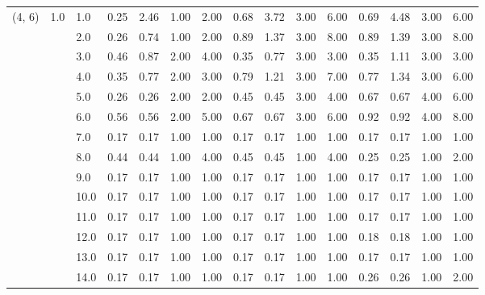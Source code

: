 \begin{tabular}{lllrrrrrrrrrrrr}
(4, 6) & 1.0 & 1.0  &       0.25 &      2.46 & 1.00 &   2.00 &       0.68 &      3.72 &  3.00 &   6.00 &       0.69 &      4.48 &  3.00 &   6.00 \\
       &     & 2.0  &       0.26 &      0.74 & 1.00 &   2.00 &       0.89 &      1.37 &  3.00 &   8.00 &       0.89 &      1.39 &  3.00 &   8.00 \\
       &     & 3.0  &       0.46 &      0.87 & 2.00 &   4.00 &       0.35 &      0.77 &  3.00 &   3.00 &       0.35 &      1.11 &  3.00 &   3.00 \\
       &     & 4.0  &       0.35 &      0.77 & 2.00 &   3.00 &       0.79 &      1.21 &  3.00 &   7.00 &       0.77 &      1.34 &  3.00 &   6.00 \\
       &     & 5.0  &       0.26 &      0.26 & 2.00 &   2.00 &       0.45 &      0.45 &  3.00 &   4.00 &       0.67 &      0.67 &  4.00 &   6.00 \\
       &     & 6.0  &       0.56 &      0.56 & 2.00 &   5.00 &       0.67 &      0.67 &  3.00 &   6.00 &       0.92 &      0.92 &  4.00 &   8.00 \\
       &     & 7.0  &       0.17 &      0.17 & 1.00 &   1.00 &       0.17 &      0.17 &  1.00 &   1.00 &       0.17 &      0.17 &  1.00 &   1.00 \\
       &     & 8.0  &       0.44 &      0.44 & 1.00 &   4.00 &       0.45 &      0.45 &  1.00 &   4.00 &       0.25 &      0.25 &  1.00 &   2.00 \\
       &     & 9.0  &       0.17 &      0.17 & 1.00 &   1.00 &       0.17 &      0.17 &  1.00 &   1.00 &       0.17 &      0.17 &  1.00 &   1.00 \\
       &     & 10.0 &       0.17 &      0.17 & 1.00 &   1.00 &       0.17 &      0.17 &  1.00 &   1.00 &       0.17 &      0.17 &  1.00 &   1.00 \\
       &     & 11.0 &       0.17 &      0.17 & 1.00 &   1.00 &       0.17 &      0.17 &  1.00 &   1.00 &       0.17 &      0.17 &  1.00 &   1.00 \\
       &     & 12.0 &       0.17 &      0.17 & 1.00 &   1.00 &       0.17 &      0.17 &  1.00 &   1.00 &       0.18 &      0.18 &  1.00 &   1.00 \\
       &     & 13.0 &       0.17 &      0.17 & 1.00 &   1.00 &       0.17 &      0.17 &  1.00 &   1.00 &       0.17 &      0.17 &  1.00 &   1.00 \\
       &     & 14.0 &       0.17 &      0.17 & 1.00 &   1.00 &       0.17 &      0.17 &  1.00 &   1.00 &       0.26 &      0.26 &  1.00 &   2.00 \\

\end{tabular}
